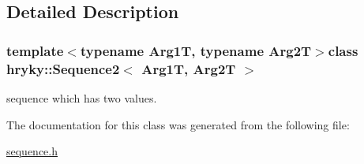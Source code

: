 \subsection{Detailed Description}
\subsubsection*{template$<$typename Arg1\-T, typename Arg2\-T$>$class hryky\-::\-Sequence2$<$ Arg1\-T, Arg2\-T $>$}

sequence which has two values. 

The documentation for this class was generated from the following file\-:\begin{DoxyCompactItemize}
\item 
\hyperlink{sequence_8h}{sequence.\-h}\end{DoxyCompactItemize}
